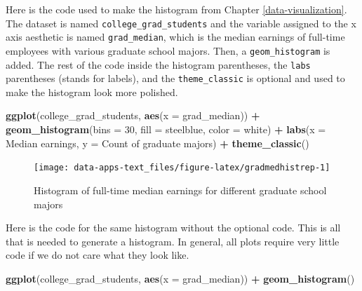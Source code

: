 \documentclass[
]{book}
\makeatletter
\newenvironment{Shaded}{\begin{snugshade}}{\end{snugshade}}
\newcommand{\AttributeTok}[1]{\textcolor[rgb]{0.27,0.27,0.27}{#1}}
\newcommand{\DecValTok}[1]{\textcolor[rgb]{0.06,0.06,0.06}{#1}}
\newcommand{\FunctionTok}[1]{\textcolor[rgb]{0.27,0.27,0.27}{\textbf{#1}}}
\newcommand{\NormalTok}[1]{#1}
\newcommand{\SpecialCharTok}[1]{\textcolor[rgb]{0.43,0.43,0.43}{\textbf{#1}}}
\newcommand{\StringTok}[1]{\textcolor[rgb]{0.5,0.5,0.5}{#1}}
\newenvironment{kframe}{%
\medskip{}
\setlength{\fboxsep}{.8em}
 \def\at@end@of@kframe{}%
 \ifinner\ifhmode%
  \def\at@end@of@kframe{\end{minipage}}%
  \begin{minipage}{\columnwidth}%
 \fi\fi%
 \def\FrameCommand##1{\hskip\@totalleftmargin \hskip-\fboxsep
 \colorbox{shadecolor}{##1}\hskip-\fboxsep
     \hskip-\linewidth \hskip-\@totalleftmargin \hskip\columnwidth}%
 \MakeFramed {\advance\hsize-\width
   \@totalleftmargin\z@ \linewidth\hsize
   \@setminipage}}%
 {\par\unskip\endMakeFramed%
 \at@end@of@kframe}
\renewenvironment{Shaded}{\begin{kframe}}{\end{kframe}}
\makeatother
\begin{document}
Here is the code used to make the histogram from Chapter \ref{data-visualization}. The dataset is named \texttt{college\_grad\_students} and the variable assigned to the x axis aesthetic is named \texttt{grad\_median}, which is the median earnings of full-time employees with various graduate school majors. Then, a \texttt{geom\_histogram} is added. The rest of the code inside the histogram parentheses, the \texttt{labs} parentheses (stands for labels), and the \texttt{theme\_classic} is optional and used to make the histogram look more polished.

\begin{Shaded}
\begin{Highlighting}[]
\FunctionTok{ggplot}\NormalTok{(college\_grad\_students, }\FunctionTok{aes}\NormalTok{(}\AttributeTok{x =}\NormalTok{ grad\_median)) }\SpecialCharTok{+}
  \FunctionTok{geom\_histogram}\NormalTok{(}\AttributeTok{bins =} \DecValTok{30}\NormalTok{, }\AttributeTok{fill =} \StringTok{\textquotesingle{}steelblue\textquotesingle{}}\NormalTok{, }\AttributeTok{color =} \StringTok{\textquotesingle{}white\textquotesingle{}}\NormalTok{) }\SpecialCharTok{+}
  \FunctionTok{labs}\NormalTok{(}\AttributeTok{x =} \StringTok{\textquotesingle{}Median earnings\textquotesingle{}}\NormalTok{, }\AttributeTok{y =} \StringTok{\textquotesingle{}Count of graduate majors\textquotesingle{}}\NormalTok{) }\SpecialCharTok{+}
  \FunctionTok{theme\_classic}\NormalTok{()}
\end{Highlighting}
\end{Shaded}

\begin{figure}

{\centering \texttt{[image: data-apps-text\_files/figure-latex/gradmedhistrep-1]} 

}

\caption{Histogram of full-time median earnings for different graduate school majors}\label{fig:gradmedhistrep}
\end{figure}

Here is the code for the same histogram without the optional code. This is all that is needed to generate a histogram. In general, all plots require very little code if we do not care what they look like.

\begin{Shaded}
\begin{Highlighting}[]
\FunctionTok{ggplot}\NormalTok{(college\_grad\_students, }\FunctionTok{aes}\NormalTok{(}\AttributeTok{x =}\NormalTok{ grad\_median)) }\SpecialCharTok{+}
  \FunctionTok{geom\_histogram}\NormalTok{()}
\end{Highlighting}
\end{Shaded}
\end{document}
